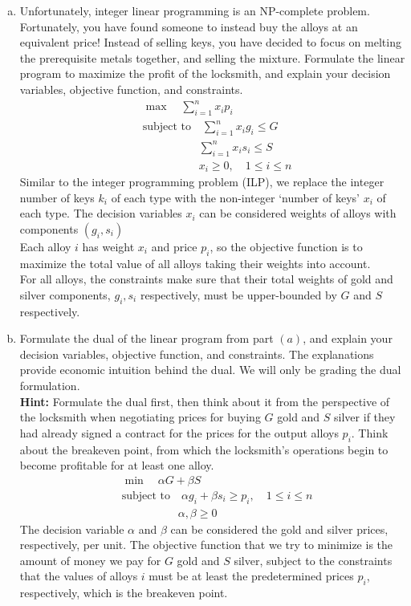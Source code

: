 \documentclass{article}\usepackage[utf8]{inputenc}\usepackage[margin=0.4cm,top=0.4cm,bottom=0.4cm]{geometry}\usepackage[usenames,dvipsnames,svgnames,table]{xcolor}
\begin{document}
\vspace{4pt}
\begin{enumerate}[(a)]
\item Unfortunately, integer linear programming is an NP-complete problem. Fortunately, you have found someone to instead buy the alloys at an equivalent price! Instead of selling keys, you have decided to focus on melting the prerequisite metals together, and selling the mixture. Formulate the linear program to maximize the profit of the locksmith, and explain your decision variables, objective function, and constraints.
\BeginSolution %
\\
%
\begin{align*}
	&\max\quad \sum_{i=1}^n x_ip_i \\
	&\text{subject to}\quad \sum_{i=1}^n x_ig_i \leq G \\
	&\qquad\qquad\quad \sum_{i=1}^n x_is_i \leq S \\
	&\qquad\qquad\quad x_i \geq 0,\quad 1 \leq i \leq n
\end{align*}
%
Similar to the integer programming problem (ILP), we replace the integer number of keys $k_i$ of each type with the non-integer `number of keys' $x_i$ of each type. The decision variables $x_i$ can be considered weights of alloys with components $(g_i,s_i)$\\
Each alloy $i$ has weight $x_i$ and price $p_i$, so the objective function is to maximize the total value of all alloys taking their weights into account.\\
For all alloys, the constraints make sure that their total weights of gold and silver components, $g_i, s_i$ respectively, must be upper-bounded by $G$ and $S$ respectively.   
\EndSolution
\item Formulate the dual of the linear program from part $(a)$, and explain your decision variables, objective function, and constraints. The explanations provide economic intuition behind the dual. We will only be grading the dual formulation.\\
\textbf{Hint:} Formulate the dual first, then think about it from the perspective of the locksmith when negotiating prices for buying $G$ gold and $S$ silver if they had already signed a contract for the prices for the output alloys $p_i$. Think about the breakeven point, from which the locksmith's operations begin to become profitable for at least one alloy.
\BeginSolution %
\\
%
\begin{align*}
	&\min\quad \alpha G + \beta S \\
	&\text{subject to}\quad \alpha g_i + \beta s_i \geq p_i,\quad 1 \leq i \leq n \\
	&\qquad\qquad\quad \alpha, \beta \geq 0
\end{align*}
%
The decision variable $\alpha$ and $\beta$ can be considered the gold and silver prices, respectively, per unit. The objective function that we try to minimize is the amount of money we pay for $G$ gold and $S$ silver, subject to the constraints that the values of alloys $i$ must be at least the predetermined prices $p_i$, respectively, which is the breakeven point.
\EndSolution
\end{enumerate}
\end{document}
